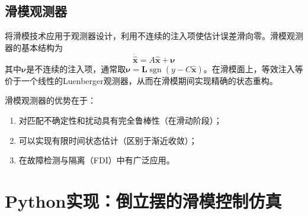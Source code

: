\subsection{滑模观测器}

将滑模技术应用于观测器设计，利用不连续的注入项使估计误差滑向零。滑模观测器的基本结构为
\[
\dot{\hat{\mathbf{x}}} = A\hat{\mathbf{x}} + \mathbf{\nu}
\]
其中$\mathbf{\nu}$是不连续的注入项，通常取$\mathbf{\nu} = \mathbf{L}\operatorname{sgn}(y - C\hat{\mathbf{x}})$。在滑模面上，等效注入等价于一个线性的Luenberger观测器，从而在滑模期间实现精确的状态重构。

滑模观测器的优势在于：
\begin{enumerate}
\item 对匹配不确定性和扰动具有完全鲁棒性（在滑动阶段）；
\item 可以实现有限时间状态估计（区别于渐近收敛）；
\item 在故障检测与隔离（FDI）中有广泛应用。
\end{enumerate}

\section{Python实现：倒立摆的滑模控制仿真}

